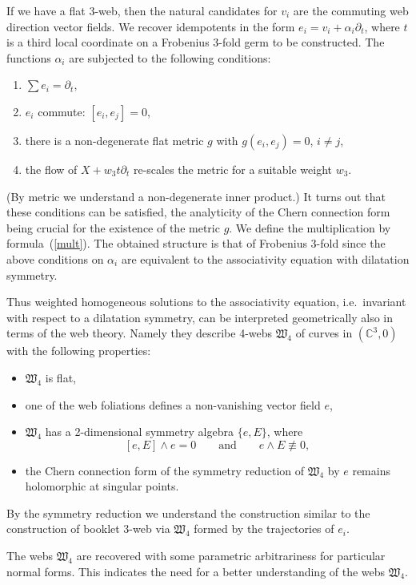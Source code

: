 \documentclass[pdftex]{sigma}
\begin{document}
If we have a f\/lat $3$-web, then the natural candidates for $v_i$ are the commuting web direction vector f\/ields. We recover idempotents in the form $e_i=v_i+\alpha_i\partial_t$, where $t$ is a third local coordinate on a Frobenius $3$-fold germ to be constructed.
The functions $\alpha_i$ are subjected to the following conditions:
\begin{enumerate}\itemsep=0pt
\item[1)] $\sum e_i=\partial_t,$
\item[2)] $e_i$ commute: $[e_i,e_j]=0$,
\item[3)] there is a non-degenerate f\/lat metric $g$ with $g(e_i,e_j)=0$, $i\ne j$,
\item[4)] the f\/low of $X+w_3t\partial_t$ re-scales the metric for a suitable weight $w_3$.
\end{enumerate}
(By metric we understand a non-degenerate inner product.)
It turns out that these conditions can be satisf\/ied, the analyticity of the Chern connection form being crucial for the existence of the metric $g$.
We def\/ine the multiplication by formula~(\ref{mult}). The obtained structure is that of Frobenius $3$-fold since the above conditions on $\alpha_i$ are equivalent to the associativity equation with dilatation symmetry.

Thus weighted homogeneous solutions to the associativity equation, i.e.\ invariant with respect to a dilatation symmetry, can be interpreted geometrically also in terms of the web theory. Namely they describe 4-webs $\mathfrak{W}_4$ of curves in $(\mathbb C^3,0)$ with the following properties:
\begin{itemize}\itemsep=0pt
\item $\mathfrak{W}_4$ is f\/lat,
\item one of the web foliations def\/ines a non-vanishing vector f\/ield $e$,
\item $\mathfrak{W}_4$ has a 2-dimensional symmetry algebra $\{e,E\}$, where
\[
[e,E]\wedge e=0\qquad\mbox{and}\qquad e\wedge E\not\equiv0,
\]
\item the Chern connection form of the symmetry reduction of $\mathfrak{W}_4$ by $e$ remains holomorphic at singular points.
\end{itemize}
By the symmetry reduction we understand the construction similar to the construction of booklet $3$-web via $\mathfrak{W}_4$ formed by the trajectories of $e_i$.

The webs $\mathfrak{W}_4$ are recovered with some parametric arbitrariness for particular normal forms. This indicates the need for a better understanding of the webs $\mathfrak{W}_4$.
\end{document}
